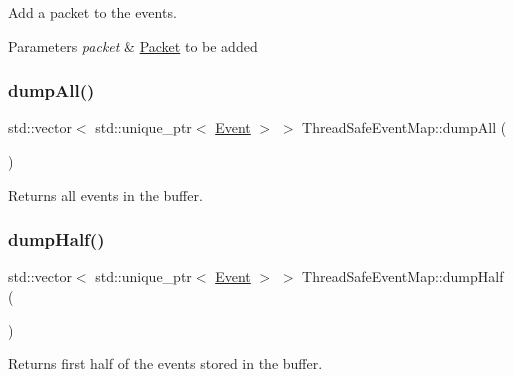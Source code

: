 Add a packet to the events. 


\begin{DoxyParams}{Parameters}
{\em packet} & \hyperlink{class_packet}{Packet} to be added \\
\hline
\end{DoxyParams}
\mbox{\label{class_thread_safe_event_map_af65f8dbd177f3db92d227b86839c275d}} 
\subsubsection{\texorpdfstring{dump\+All()}{dumpAll()}}
{\footnotesize\ttfamily std\+::vector$<$ std\+::unique\+\_\+ptr$<$ \hyperlink{class_event}{Event} $>$ $>$ Thread\+Safe\+Event\+Map\+::dump\+All (\begin{DoxyParamCaption}{ }\end{DoxyParamCaption})}



Returns all events in the buffer. 

\mbox{\label{class_thread_safe_event_map_a655bf86c67d1e8d0e8276b012f5fab8d}} 
\subsubsection{\texorpdfstring{dump\+Half()}{dumpHalf()}}
{\footnotesize\ttfamily std\+::vector$<$ std\+::unique\+\_\+ptr$<$ \hyperlink{class_event}{Event} $>$ $>$ Thread\+Safe\+Event\+Map\+::dump\+Half (\begin{DoxyParamCaption}{ }\end{DoxyParamCaption})}



Returns first half of the events stored in the buffer. 

\mbox{\label{class_thread_safe_event_map_a203143086874b97171101871ba2c4f6f}} 

